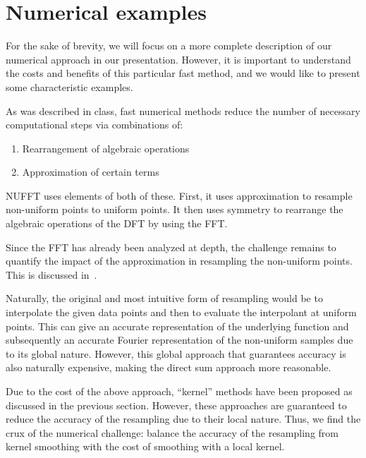 \section{Numerical examples}

For the sake of brevity, we will focus on a more complete description of our numerical approach in our presentation.
However, it is important to understand the costs and benefits of this particular fast method, and we would like to present some characteristic examples.

As was described in class, fast numerical methods reduce the number of necessary computational steps via combinations of:
\begin{enumerate}
    \item Rearrangement of algebraic operations
    \item Approximation of certain terms
\end{enumerate}
NUFFT uses elements of both of these.
First, it uses approximation to resample non-uniform points to uniform points.
It then uses symmetry to rearrange the algebraic operations of the DFT by using the FFT.

Since the FFT has already been analyzed at depth, the challenge remains to quantify the impact of the approximation in resampling the non-uniform points.
This is discussed in~\cite{SISC-1993-Dutt-Rokhlin}. %

Naturally, the original and most intuitive form of resampling would be to interpolate the given data points and then to evaluate the interpolant at uniform points.
This can give an accurate representation of the underlying function and subsequently an accurate Fourier representation of the non-uniform samples due to its global nature.
However, this global approach that guarantees accuracy is also naturally expensive, making the direct sum approach more reasonable. %

Due to the cost of the above approach, ``kernel'' methods have been proposed as discussed in the previous section.
However, these approaches are guaranteed to reduce the accuracy of the resampling due to their local nature.
Thus, we find the crux of the numerical challenge: balance the accuracy of the resampling from kernel smoothing with the cost of smoothing with a local kernel.

